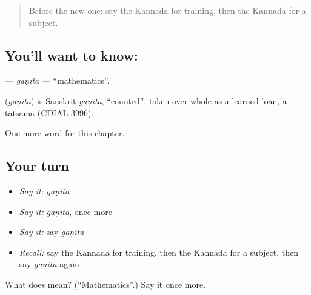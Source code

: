 \begin{quote}
Before the new one: say the Kannada for training, then the Kannada for a subject.
\end{quote}

\subsection*{You'll want to know: }
\textbf{} — \emph{gaṇita} — \textquotedblleft{}mathematics\textquotedblright{}.

\begin{cousinweb}
\textbf{} (\emph{gaṇita}) is Sanskrit \emph{gaṇita}, \textquotedblleft{}counted\textquotedblright{}, taken over whole as a learned loan, a tatsama (CDIAL 3996).
\end{cousinweb}

\begin{grammarlens}[title={What you've built}]
One more word for this chapter.
\end{grammarlens}

\subsection*{Your turn}
\begin{itemize}
\raggedright
  \item \emph{Say it:} \emph{gaṇita}
  \item \emph{Say it:} \emph{gaṇita}, once more
  \item \emph{Say it:} say \emph{gaṇita}
  \item \emph{Recall:} say the Kannada for training, then the Kannada for a subject, then say \emph{gaṇita} again
\end{itemize}

\begin{tcolorbox}[breakable,colback=teal!4,colframe=teal!35!black,title={Before you move on}]
What does  mean? (\textquotedblleft{}Mathematics\textquotedblright{}.) Say it once more.
\end{tcolorbox}
